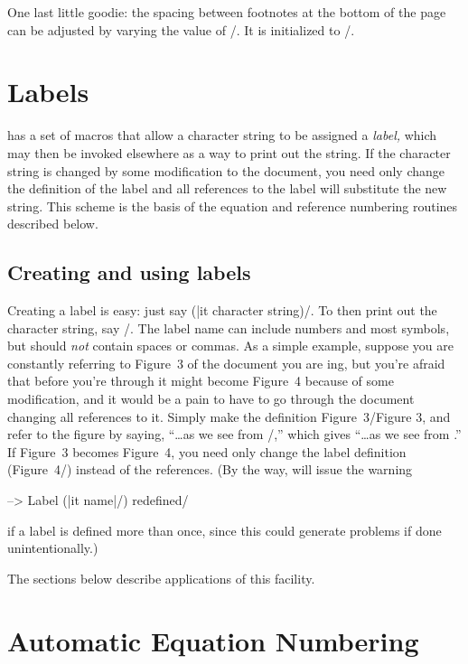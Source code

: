 \begin{(|it
name|/)}
\begin{(|it
name|/)}
\begin{narrow}[.80in]
\begin{narrow}
One last little goodie: the spacing between footnotes at the bottom of the
page can be adjusted by varying the value of \tts\footnoteskip/. It is
initialized to /.


{\bigfonts\bfs\section{Labels}}

\jyTeX{} has a set of macros that allow a character string to be assigned a
{\it label,} which may then be invoked elsewhere as a way to print out the
string.  If the character string is changed by some modification to the
document, you need only change the definition of the label and all references
to the label will substitute the new string.  This scheme is the basis of the
equation and reference numbering routines described below.

{\sl\subsection{Creating and using labels}}

Creating a label is easy: just say \tts\label{(|it name)}{(|it character
string)}/.  To then print out the character string, say \tts{}/.  The label name can include numbers and most symbols, but should {\it
not\/} contain spaces or commas.  As a simple example, suppose you are
constantly referring to Figure~3 of the document you are \jyTeX ing, but you're
afraid that before you're through it might become Figure~4 because of some
modification, and it would be a pain to have to go through the document
changing all references to it.  Simply make the definition
\tts\label{lab1}{Figure~3}/\label{lab1}{Figure 3}, and refer to the figure by
saying, ``\dots\tts as we see from /,'' which gives ``\dots as we
see from .'' If Figure~3 becomes Figure~4, you need only change
the label definition (\tts\label{lab1}{Figure~4}/) instead of the references.
(By the way, \jyTeX{} will issue the warning

\smallskip

\tts--> Label (|it name|/) redefined/

\smallskip

\noindent if a label is defined more than once, since this could generate
problems if done unintentionally.)

The sections below describe applications of this facility.


{\bigfonts\bfs\section{Automatic Equation Numbering}}


\end{narrow}
\end{narrow}
\end{(|it
name|/)}
\end{(|it
name|/)}
